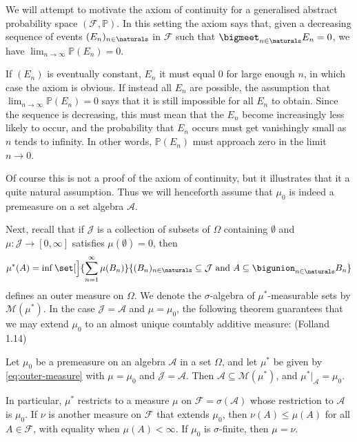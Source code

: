 \documentclass[article, a4paper, 11pt, oneside]{memoir}
\numberwithin{equation}{chapter}
\newcommand{\calF}{\mathcal{F}}
\newcommand{\calA}{\mathcal{A}}
\newcommand{\calJ}{\mathcal{J}}
\newcommand{\calM}{\mathcal{M}}
\renewcommand{\P}{\mathbb{P}}
\begin{document}
We will attempt to motivate the axiom of continuity for a generalised abstract probability space $(\calF, \P)$. In this setting the axiom says that, given a decreasing sequence of events $(E_n)_{n\in\naturals}$ in $\calF$ such that $\bigmeet_{n\in\naturals} E_n = 0$, we have $\lim_{n\to\infty} \P(E_n) = 0$.

If $(E_n)$ is eventually constant, $E_n$ it must equal $0$ for large enough $n$, in which case the axiom is obvious. If instead all $E_n$ are possible, the assumption that $\lim_{n\to\infty} \P(E_n) = 0$ says that it is still impossible for all $E_n$ to obtain. Since the sequence is decreasing, this must mean that the $E_n$ become increasingly less likely to occur, and the probability that $E_n$ occurs must get vanishingly small as $n$ tends to infinity. In other words, $\P(E_n)$ must approach zero in the limit $n \to 0$.

Of course this is not a proof of the axiom of continuity, but it illustrates that it a quite natural assumption. Thus we will henceforth assume that $\mu_0$ is indeed a premeasure on a set algebra $\calA$.

Next, recall that if $\calJ$ is a collection of subsets of $\Omega$ containing $\emptyset$ and $\mu \colon \calJ \to [0,\infty]$ satisfies $\mu(\emptyset) = 0$, then
%
\begin{equation}
    \label{eq:outer-measure}
    \mu^*(A)
        = \inf \set[\Big]{
            \sum_{n=1}^\infty \mu(B_n)
        }{
            (B_n)_{n \in \naturals} \subseteq \calJ
            \text{ and }
            A \subseteq \bigunion_{n \in \naturals} B_n
        }
\end{equation}
%
defines an outer measure on $\Omega$. We denote the $\sigma$-algebra of $\mu^*$-measurable sets by $\calM(\mu^*)$. In the case $\calJ = \calA$ and $\mu = \mu_0$, the following theorem guarantees that we may extend $\mu_0$ to an almost unique countably additive measure: (Folland 1.14)

\begin{theorem}
    Let $\mu_0$ be a premeasure on an algebra $\calA$ in a set $\Omega$, and let $\mu^*$ be given by \cref{eq:outer-measure} with $\mu = \mu_0$ and $\calJ = \calA$. Then $\calA \subseteq \calM(\mu^*)$, and $\mu^*|_\calA = \mu_0$.

    In particular, $\mu^*$ restricts to a measure $\mu$ on $\calF = \sigma(\calA)$ whose restriction to $\calA$ is $\mu_0$. If $\nu$ is another measure on $\calF$ that extends $\mu_0$, then $\nu(A) \leq \mu(A)$ for all $A \in \calF$, with equality when $\mu(A) < \infty$. If $\mu_0$ is $\sigma$-finite, then $\mu = \nu$.
\end{theorem}
\end{document}
